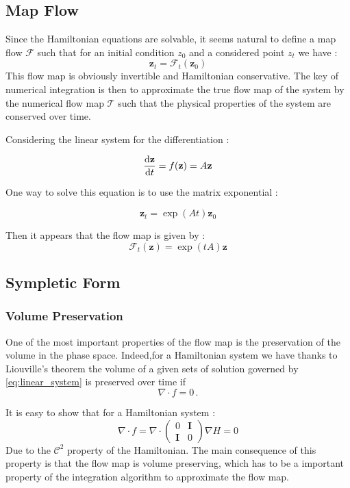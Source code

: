 \documentclass[ansiapaper]{report}
\begin{document}
\begin{multicols}{3}
	\subsection{Map Flow}

	Since the Hamiltonian equations are solvable, it seems natural to define a map flow $\mathcal{F}$ such that for an initial condition $z_0$ and a considered point $z_t$ we have :
	$$\textbf{z} _t = \mathcal{F}_t(\textbf{z}_0)$$
	This flow map is obviously invertible and Hamiltonian conservative. The key of numerical integration is then to approximate the true flow map of the system by the numerical flow map $\mathcal{T}$ such that the physical properties of the system are conserved over time.

	Considering the linear system for the differentiation :

	\begin{equation}
		\label{eq:linear_system}
		\dv{\textbf{z}}{t} = f(\textbf{z} ) = A\textbf{z}
	\end{equation}

	One way to solve this equation is to use the matrix exponential :

	$$\textbf{z}_t = \exp(At)\textbf{z}_0$$

	Then it appears that the flow map is given by :
	\begin{equation}
		\label{eq:flow_map}
		\mathcal{F}_t(\textbf{z} ) = \exp(tA)\textbf{z}
	\end{equation}

	\subsection{Sympletic Form}

	\subsubsection{Volume Preservation}
	One of the most important properties of the flow map is the preservation of the volume in the phase space. Indeed,for a Hamiltonian system we have thanks to Liouville's theorem the volume of a given sets of solution governed by \cref{eq:linear_system} is preserved over time if $$ \nabla \cdot f = 0 \, .$$

	It is easy to show that for a Hamiltonian system : $$\nabla \cdot f = \nabla \cdot \begin{pmatrix}
			0          & \textbf{I} \\
			\textbf{I} & 0
		\end{pmatrix} \nabla H = 0$$
	Due to the $\mathcal{C}^2$ property of the Hamiltonian. The main consequence of this property is that the flow map is volume preserving, which has to be a important property of the integration algorithm to approximate the flow map.


\end{multicols}
\end{document}

